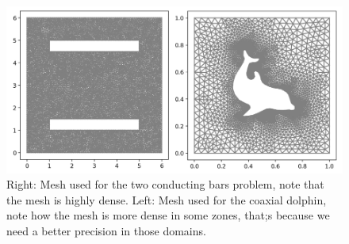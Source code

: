 \documentclass{PoS}
\begin{document}
\begin{figure}
\begin{center}
\includegraphics[width=.95\textwidth]{Figures/FEM/Meshes.png}
\caption{Right: Mesh used for the two conducting bars problem, note that the mesh is highly dense. Left: Mesh used for the coaxial dolphin, note how the mesh is more dense in some zones, that;s because we need a better precision in those domains.}
\label{fig:Meshes}
\end{center}
\end{figure}



\end{document}
